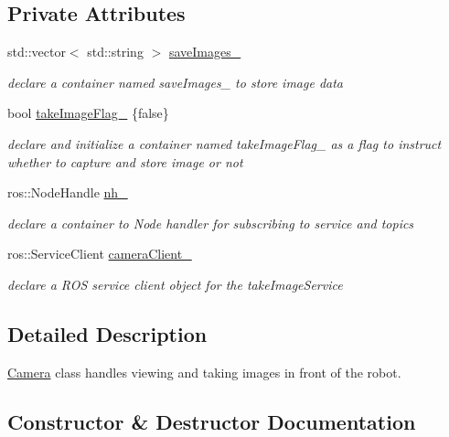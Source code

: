 \subsection*{Private Attributes}
\begin{DoxyCompactItemize}
\item 
std\+::vector$<$ std\+::string $>$ \hyperlink{classCamera_a9ffeac410066cafa8538041f66830067}{save\+Images\+\_\+}
\begin{DoxyCompactList}\small\item\em declare a container named save\+Images\+\_\+ to store image data \end{DoxyCompactList}\item 
bool \hyperlink{classCamera_af0d737a2c07092eafccd2e8c6c124e0b}{take\+Image\+Flag\+\_\+} \{false\}
\begin{DoxyCompactList}\small\item\em declare and initialize a container named take\+Image\+Flag\+\_\+ as a flag to instruct whether to capture and store image or not \end{DoxyCompactList}\item 
ros\+::\+Node\+Handle \hyperlink{classCamera_a888df900bc4c72a61dbb9b0b609c3cf8}{nh\+\_\+}
\begin{DoxyCompactList}\small\item\em declare a container to Node handler for subscribing to service and topics \end{DoxyCompactList}\item 
ros\+::\+Service\+Client \hyperlink{classCamera_a93ed3666fbe5146aa32cc028b27db4bd}{camera\+Client\+\_\+}
\begin{DoxyCompactList}\small\item\em declare a R\+OS service client object for the take\+Image\+Service \end{DoxyCompactList}\end{DoxyCompactItemize}


\subsection{Detailed Description}
\hyperlink{classCamera}{Camera} class handles viewing and taking images in front of the robot. 

\subsection{Constructor \& Destructor Documentation}
